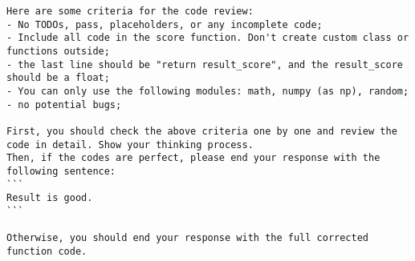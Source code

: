 \begin{tcolorbox}[
breakable,
title=Refine code for game policy components,  
colframe=promptcolor, 
colback=white,
]
\begin{lstlisting}[]
Here are some criteria for the code review:
- No TODOs, pass, placeholders, or any incomplete code;
- Include all code in the score function. Don't create custom class or functions outside;
- the last line should be "return result_score", and the result_score should be a float;
- You can only use the following modules: math, numpy (as np), random;
- no potential bugs;

First, you should check the above criteria one by one and review the code in detail. Show your thinking process.
Then, if the codes are perfect, please end your response with the following sentence:
```
Result is good.
```

Otherwise, you should end your response with the full corrected function code. 
\end{lstlisting}
\end{tcolorbox}